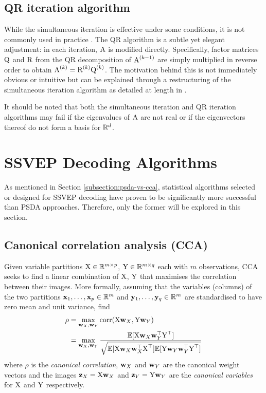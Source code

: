 \subsection{QR iteration algorithm}
While the simultaneous iteration is effective under some conditions, it is not commonly used in practice \cite{panju-iterative-eig}. The QR algorithm is a subtle yet elegant adjustment: in each iteration, ${\textrm{A}}$ is modified directly. Specifically, factor matrices ${\textrm{Q}}$ and ${\textrm{R}}$ from the QR decomposition of ${\textrm{A}}^{(k-1)}$ are simply multiplied in reverse order to obtain ${\textrm{A}}^{(k)} = {\textrm{R}}^{(k)}{\textrm{Q}}^{(k)}$. The motivation behind this is not immediately obvious or intuitive but can be explained through a restructuring of the simultaneous iteration algorithm as detailed at length in \cite{panju-iterative-eig}. 

It should be noted that both the simultaneous iteration and QR iteration algorithms may fail if the eigenvalues of ${\textrm{A}}$ are not real or if the eigenvectors thereof do not form a basis for $\mathbb{R}^d$. 

\section{SSVEP Decoding Algorithms}
As mentioned in Section \ref{subsection:psda-vs-cca}, statistical algorithms selected or designed for SSVEP decoding have proven to be significantly more successful than PSDA approaches. Therefore, only the former will be explored in this section.

\subsection{Canonical correlation analysis (CCA)}
\label{section:cca-c3}
Given variable partitions ${\textrm{X}} \in \mathbb{R}^{m\times p}$, ${\textrm{Y}} \in \mathbb{R}^{m\times q}$ each with $m$ observations, CCA seeks to find a linear combination of ${\textrm{X}}$, ${\textrm{Y}}$ that maximises the correlation between their images. More formally, assuming that the variables (columns) of the two partitions ${\mathbf{x}}_1, \dots, {\mathbf{x}}_p \in \mathbb{R}^{m}$ and ${\mathbf{y}}_1, \dots, {\mathbf{y}}_q \in \mathbb{R}^{m}$ are standardised to have zero mean and unit variance, find
\begin{align}
    \rho &= \max_{{\mathbf{w}}_X, {\mathbf{w}}_Y} \textrm{corr}({\textrm{X}} {\mathbf{w}}_X, {\textrm{Y}} {\mathbf{w}}_Y) \\
    &= \max_{{\mathbf{w}}_X, {\mathbf{w}}_Y} \frac{{\mathbb{E}}[{\textrm{X}} {\mathbf{w}}_X{\mathbf{w}}_Y^\top{\textrm{Y}}^\top ]}{\sqrt{{\mathbb{E}}[{\textrm{X}} {\mathbf{w}}_X{\mathbf{w}}_X^\top{\textrm{X}}^\top]{\mathbb{E}}[{\textrm{Y}} {\mathbf{w}}_Y{\mathbf{w}}_Y^\top{\textrm{Y}}^\top]}}
    \label{eq:cca-corr-objective}
\end{align}
where $\rho$ is the \textit{canonical correlation}, ${\mathbf{w}}_X$ and ${\mathbf{w}}_Y$ are the canonical weight vectors and the images ${\mathbf{z}}_X = {\textrm{X}}{\mathbf{w}}_X$ and ${\mathbf{z}}_Y = {\textrm{Y}}{\mathbf{w}}_Y$ are the \textit{canonical variables} for ${\textrm{X}}$ and ${\textrm{Y}}$ respectively.

